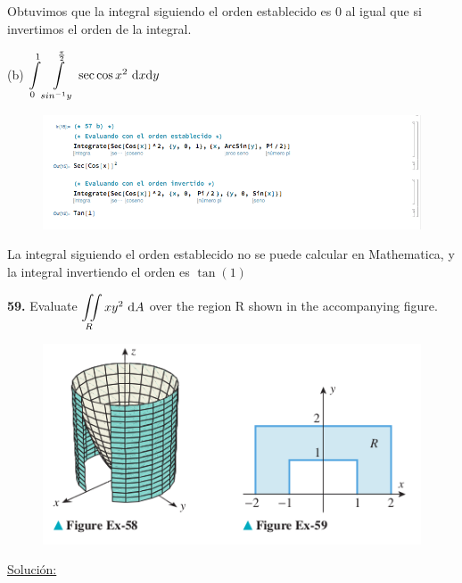 \documentclass[11pt]{report}
\newcommand{\s}{\underline{Soluci\'{o}n:}}
\begin{document}
Obtuvimos que la integral siguiendo el orden establecido
es $0$ al igual que si invertimos el orden de la integral.

(b) $ {\displaystyle \int \limits_0^1 \int \limits_{sin^{-1}y}^{\frac{\pi}{2}} } \, \sec{\cos{x}}^2 \, \, \text dx \text dy $ \\
\begin{figure}[h]
\includegraphics[scale=0.5]{img3.png}
\centering
\end{figure}

La integral siguiendo el orden establecido no se puede calcular en Mathematica,
y la integral invertiendo el orden es $\tan(1)$

\textbf{59.} Evaluate $ {\displaystyle \iint \limits_R } \, xy^2 \, \, \text dA $ over
the region R shown in the accompanying figure. \\
\begin{figure}[h]
\includegraphics[scale=0.5]{img2.png}
\centering
\end{figure}

\s
\end{document}
